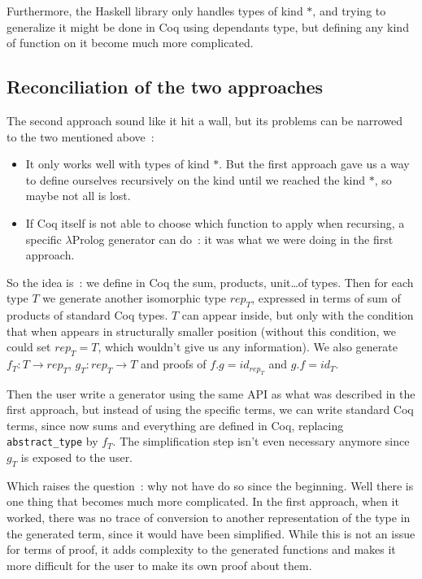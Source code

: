 \documentclass{article}
\begin{document}
Furthermore, the Haskell library only handles types of kind $*$, and trying
to generalize it might be done in Coq using dependants type, but defining any
kind of function on it become much more complicated.

\subsection{Reconciliation of the two approaches}

The second approach sound like it hit a wall, but its problems can be narrowed to
the two mentioned above~: \begin{itemize}
    \item It only works well with types of kind $*$. But the first approach gave
        us a way to define ourselves recursively on the kind until we reached
        the kind $*$, so maybe not all is lost.
    \item If Coq itself is not able to choose which function to apply when
        recursing, a specific $\lambda$Prolog generator can do~: it was what
        we were doing in the first approach.
\end{itemize}

So the idea is~: we define in Coq the sum, products, unit\ldots of types.
Then for each type $T$ we generate another isomorphic type $rep_T$, expressed
in terms of sum of products of standard Coq types. $T$ can appear inside,
but only with the condition that when appears in structurally smaller position
(without this condition, we could set $rep_T = T$, which wouldn't give us
any information). We also generate $f_T : T \rightarrow rep_T$, $g_T : rep_T\rightarrow T$
and proofs of $f . g = id_{rep_T}$ and $g . f = id_T$.

Then the user write a generator using the same API as what was described in the
first approach, but instead of using the specific terms, we can write standard
Coq terms, since now sums and everything are defined in Coq, replacing
\texttt{abstract\_type} by $f_T$. The simplification step isn't even necessary
anymore since $g_T$ is exposed to the user.

Which raises the question~: why not have do so since the beginning. Well there
is one thing that becomes much more complicated. In the first approach, when it
worked, there was no trace of conversion to another representation of the type
in the generated term, since it would have been simplified. While this is not
an issue for terms of proof, it adds complexity to the generated functions and
makes it more difficult for the user to make its own proof about them.
\end{document}
